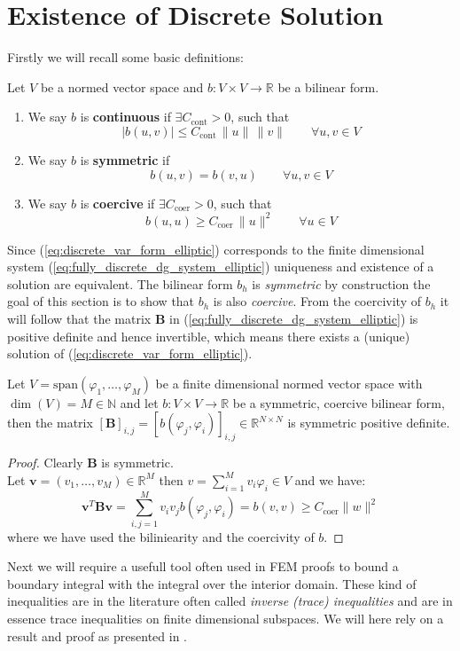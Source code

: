 \section{Existence of Discrete Solution}
\label{sec:existence_uniqueness_elliptic_discrete_problem}
Firstly we will recall some basic definitions:
\begin{definition} Let $V$ be a normed vector space and $b:V\times V \to \mathbb{R}$
	be a bilinear form.
	\begin{enumerate}[label=\textnormal{(\roman*)}]
		\item We say $b$ is \textbf{continuous} if $\exists C_{\text{cont}}>0$, such that
		      \[
			      |b(u,v)|\leq C_{\text{cont}}\, \|u\|\, \|v\| \qquad \forall u,v \in V
		      \]
		\item We say $b$ is \textbf{symmetric} if
		      \[
			      b(u,v) = b(v,u) \qquad \forall u,v \in V
		      \]
		\item We say $b$ is \textbf{coercive} if $\exists C_{\text{coer}}>0$, such that
		      \[
			      b(u,u)\geq C_{\text{coer}}\, \|u\|^2 \qquad \forall u \in V
		      \]
	\end{enumerate}
\end{definition}


Since (\ref{eq:discrete_var_form_elliptic}) corresponds to the finite dimensional
system (\ref{eq:fully_discrete_dg_system_elliptic}) uniqueness and existence of a solution
are equivalent.
The bilinear form $b_h$ is \textit{symmetric} by construction
the goal of this section is to show that $b_h$ is also \textit{coercive}.
From the coercivity of $b_h$ it will follow that the matrix $\textbf{B}$ in (\ref{eq:fully_discrete_dg_system_elliptic})
is positive definite and hence invertible, which means there exists a (unique) solution
of (\ref{eq:discrete_var_form_elliptic}).
\begin{lemma}
	Let $V = \text{span}(\varphi_1,\ldots,\varphi_M)$ be a finite dimensional
	normed vector space with $\dim(V) = M\in \mathbb{N}$ and let
	$b:V \times V \to \mathbb{R}$ be a symmetric, coercive bilinear form,
	then the matrix ${[\textbf{B}]}_{i,j} = {[b(\varphi_j, \varphi_i)]}_{i,j}\in \mathbb{R}^{N\times N}$
	is symmetric positive definite.
\end{lemma}
\begin{proof}
	Clearly $\textbf{B}$ is symmetric. \\
	Let $\textbf{v}=(v_1,\ldots,v_M)\in \mathbb{R}^M$ then $v = \sum_{i=1}^{M}
		v_i \varphi_i\in V$ and we have:
	\[
		\textbf{v}^{T}\textbf{B}\textbf{v} = \sum_{i,j=1}^{M}v_i v_j b(\varphi_j,\varphi_i) = b(v,v) \geq
		C_{\text{coer}} \|w\|^2
	\]
	where we have used the biliniearity and the coercivity of $b$.
\end{proof}
Next we will require a usefull tool often used in FEM proofs to bound
a boundary integral with the integral over the interior domain. These kind
of inequalities are in the literature often called \textit{inverse (trace) inequalities}
and are in essence trace inequalities on finite dimensional subspaces.
We will here rely on a result and proof as presented in \cite{warburtonHesthaven2003ineq}.

